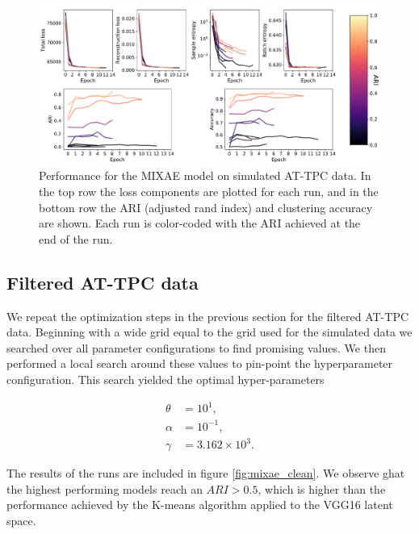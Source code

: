 \begin{figure}[H]
\centering
\includegraphics[width=\textwidth]{./plots/sim_mixae.pdf}
\caption{Performance for the MIXAE model on simulated AT-TPC data. In the top row the loss components are plotted for each run, and in the bottom row the ARI (adjusted rand index) and clustering accuracy are shown. Each run is color-coded with the ARI achieved at the end of the run. }\label{fig:mixae_sim}
\end{figure}

\subsection{Filtered AT-TPC data}

We repeat the optimization steps in the previous section for the filtered AT-TPC data. Beginning with a wide grid equal to the grid used for the simulated data we searched over all parameter configurations to find promising values. We then performed a local search around these values to pin-point the hyperparameter configuration. This search yielded the optimal hyper-parameters 

\begin{align}
\theta &= 10^{1}, \\
\alpha &= 10^{-1}, \\
\gamma &= 3.162\times 10^3.
\end{align}

\noindent The results of the runs are included in figure \ref{fig:mixae_clean}. We observe ghat the highest performing models reach an $ARI > 0.5$, which is higher than the performance achieved by the K-means algorithm applied to the VGG16 latent space. 

